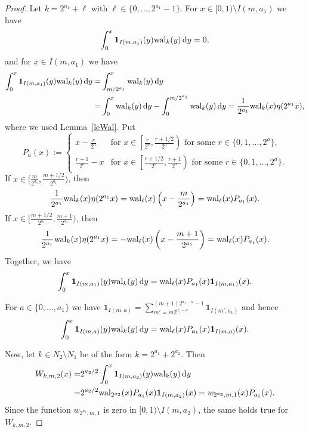 \documentclass[namedate,webpdf,imanum]{ima-authoring-arxiv}%
\theoremstyle{thmstyletwo}%
\numberwithin{equation}{section}
\newcommand{\rd}{\, {\rm d}}
\newcommand{\wal}{{\rm wal}}
\newcommand{\bsone}{\boldsymbol{1}}
\begin{document}
\begin{appendix}
\begin{proof}
Let $k = 2^{a_1} + \ell$ with $\ell \in \{0,\ldots, 2^{a_1}-1\}$. For $x \in [0,1)\setminus I(m,a_1)$ we have
\begin{equation*}
\int_0^x \bsone_{I(m,a_1)}(y) \wal_k(y) \rd y = 0,
\end{equation*}
and for $x \in I(m,a_1)$ we have 
\begin{align*}
\int_0^x \bsone_{I(m,a_1)}(y) \wal_k(y) \rd y = & \int_{m/2^{a_1}}^x \wal_k(y) \rd y \\
= & \int_0^x \wal_k(y) \rd y - \int_0^{m/2^{a_1}} \wal_k(y) \rd y =  \frac{1}{2^{a_1}} \wal_k(x) \eta(2^{a_1}x),
\end{align*}
where we used Lemma~\ref{leWal}. Put
\begin{equation*}
P_a(x) := \begin{cases} x - \frac{r}{2^a} & \mbox{for } x \in \left[\frac{r}{2^a}, \frac{r+1/2}{2^a}\right) \mbox{ for some } r \in \{0, 1, \ldots, 2^a\}, \\[0,5em] \frac{r+1}{2^a} - x & \mbox{for } x \in \left[\frac{r+1/2}{2^a}, \frac{r+1}{2^a} \right) \mbox{ for some } r \in \{0, 1, \ldots, 2^a\}. \end{cases}
\end{equation*}
If $x \in [\frac{m}{2^{a_1}},\frac{m+1/2}{2^{a_1}})$, then $$\frac{1}{2^{a_1}} \wal_k(x) \eta(2^{a_1}x) =\wal_{\ell}(x) \left(x-\frac{m}{2^{a_1}}\right)=\wal_{\ell}(x) P_{a_1}(x).$$  If $x \in [\frac{m+1/2}{2^{a_1}},\frac{m+1}{2^{a_1}})$, then $$\frac{1}{2^{a_1}} \wal_k(x) \eta(2^{a_1}x) =-\wal_{\ell}(x) \left(x-\frac{m+1}{2^{a_1}}\right)=\wal_{\ell}(x) P_{a_1}(x).$$
Together, we have
\begin{equation*}
\int_0^x \bsone_{I(m,a_1)}(y) \wal_k(y) \rd y = \wal_{\ell}(x) P_{a_1}(x) \bsone_{I(m,a_1)}(x).
\end{equation*}

For $a \in \{0,\ldots,a_1\}$ we have $\bsone_{I(m,a)}=\sum_{m'=m 2^{a_1-a}}^{(m+1) 2^{a_1-a}-1} \bsone_{I(m',a_1)}$ and hence
\begin{equation*}
\int_0^x \bsone_{I(m,a)}(y) \wal_k(y) \rd y = \wal_{\ell}(x) P_{a_1}(x) \bsone_{I(m,a)}(x).
\end{equation*}

Now, let $k \in N_{2}\setminus N_{1}$ be of the form $k=2^{a_1}+2^{a_{2}}$. Then 
\begin{align*}
W_{k,m,2}(x) = & 2^{a_2 /2} \int_0^{x} \boldsymbol{1}_{I(m,a_2)}(y) \wal_k(y) \rd y\\
= & 2^{a_2 /2} \wal_{2^{a_2}}(x) P_{a_1}(x) \bsone_{I(m,a_{2})}(x) = w_{2^{a_2},m,1}(x) P_{a_1}(x).
\end{align*}
Since the function $w_{2^{a_2},m,1}$ is zero in $[0, 1) \setminus I(m,a_2)$, the same holds true for $W_{k,m,2}$.


\end{proof}
\end{appendix}
\end{document}

